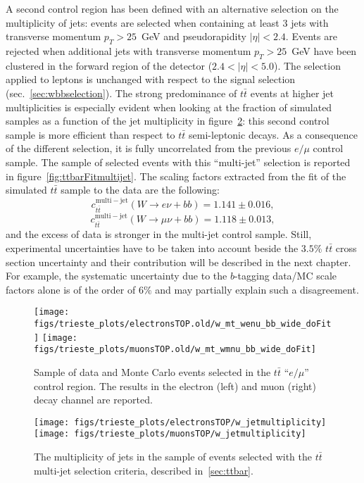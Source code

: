 A second control region has been defined with an alternative selection 
on the multiplicity of jets: events are selected when containing at least $3$ jets 
with transverse momentum $p_{T}>25$~GeV and pseudorapidity $|\eta|<2.4$. 
Events are rejected when additional jets with transverse momentum $p_{T}>25$~GeV 
have been clustered in the forward region of the detector ($2.4<|\eta|<5.0$).
The selection applied to leptons is unchanged with respect to the signal selection 
(sec.~\ref{sec:wbbselection}). The strong predominance of $t\bar{t}$ events at higher 
jet multiplicities is especially evident when looking at the fraction of simulated 
samples as a function of the jet multiplicity in figure~\ref{fig:jetmultiplicity}:
this second control sample is more efficient than respect to $t\bar{t}$ 
semi-leptonic decays. As a consequence of the different selection,
it is fully uncorrelated from the previous $e/\mu$ control sample.
The sample of selected events with this ``multi-jet'' 
selection is reported in figure~\ref{fig:ttbarFitmultijet}.
The scaling factors extracted from the fit of the simulated $t\bar{t}$ sample 
to the data are the following:
$$c_{t\bar{t}}^{\mathrm{multi-jet}}(W \rightarrow e \nu + bb) = 1.141 \pm 0.016 \mathrm{,}$$
$$c_{t\bar{t}}^{\mathrm{multi-jet}}(W \rightarrow \mu \nu + bb) =1.118 \pm 0.013 \mathrm{,}$$
and the excess of data is stronger in the multi-jet control sample. 
Still, experimental uncertainties have to be taken into account beside the 
$3.5\%$ $t\bar{t}$ cross section uncertainty and their contribution 
will be described in the next chapter.
For example, the systematic uncertainty due to the $b$-tagging data/MC scale factors alone 
is of the order of $6\%$ and may partially explain such a disagreement.


\begin{figure}[htb]
	\begin{center}
		\leavevmode
		\texttt{[image: figs/trieste\_plots/electronsTOP.old/w\_mt\_wenu\_bb\_wide\_doFit]}
		\texttt{[image: figs/trieste\_plots/muonsTOP.old/w\_mt\_wmnu\_bb\_wide\_doFit]}
	\end{center}
	\caption{Sample of data and Monte Carlo events selected in the $t\bar{t}$ ``$e/\mu$'' control region. 
          The results in the electron (left) and muon (right) decay channel are reported.}
	\label{fig:ttbarFitemu}
\end{figure}

\begin{figure}[htb]
	\begin{center}
		\leavevmode
		\texttt{[image: figs/trieste\_plots/electronsTOP/w\_jetmultiplicity]}
		\texttt{[image: figs/trieste\_plots/muonsTOP/w\_jetmultiplicity]}
	\end{center}
	\caption{The multiplicity of jets in the sample 
          of events selected with the $t\bar{t}$ multi-jet selection 
          criteria, described in~\ref{sec:ttbar}.}
	\label{fig:jetmultiplicity}
\end{figure}


